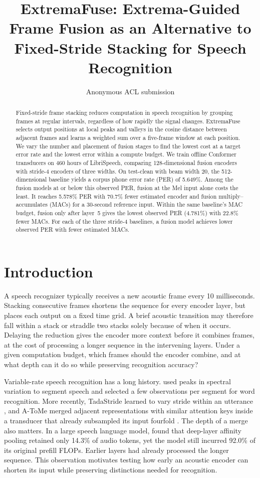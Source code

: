 \documentclass[11pt]{article}
\title{ExtremaFuse: Extrema-Guided Frame Fusion as an Alternative to
Fixed-Stride Stacking for Speech Recognition}
\author{Anonymous ACL submission}
\begin{document}
\maketitle

\begin{abstract}
Fixed-stride frame stacking reduces computation in speech recognition by grouping frames at regular intervals, regardless of how rapidly the signal changes.
ExtremaFuse selects output positions at local peaks and valleys in the cosine distance between adjacent frames and learns a weighted sum over a five-frame window at each position.
We vary the number and placement of fusion stages to find the lowest cost at a target error rate and the lowest error within a compute budget.
We train offline Conformer transducers on 460 hours of LibriSpeech, comparing 128-dimensional fusion encoders with stride-4 encoders of three widths.
On test-clean with beam width 20, the 512-dimensional baseline yields a corpus phone error rate (PER) of 5.649\%.
Among the fusion models at or below this observed PER, fusion at the Mel input alone costs the least. It reaches 5.578\% PER with 70.7\% fewer estimated encoder and fusion multiply--accumulates (MACs) for a 30-second reference input.
Within the same baseline's MAC budget, fusion only after layer~5 gives the lowest observed PER (4.781\%) with 22.8\% fewer MACs.
For each of the three stride-4 baselines, a fusion model achieves lower observed PER with fewer estimated MACs.
\end{abstract}

\section{Introduction}
A speech recognizer typically receives a new acoustic frame every 10 milliseconds. Stacking consecutive frames shortens the sequence for every encoder layer, but places each output on a fixed time grid. A brief acoustic transition may therefore fall within a stack or straddle two stacks solely because of when it occurs. Delaying the reduction gives the encoder more context before it combines frames, at the cost of processing a longer sequence in the intervening layers. Under a given computation budget, which frames should the encoder combine, and at what depth can it do so while preserving recognition accuracy?

Variable-rate speech recognition has a long history. \citet{flammia92_icslp} used peaks in spectral variation to segment speech and selected a few observations per segment for word recognition. More recently, TadaStride learned to vary stride within an utterance \citep{lee-jung-2025-tadastride}, and A-ToMe merged adjacent representations with similar attention keys inside a transducer that already subsampled its input fourfold \citep{li23i_interspeech}. The depth of a merge also matters. In a large speech language model, \citet{xiang-etal-2026-need} found that deep-layer affinity pooling retained only 14.3\% of audio tokens, yet the model still incurred 92.0\% of its original prefill FLOPs. Earlier layers had already processed the longer sequence. This observation motivates testing how early an acoustic encoder can shorten its input while preserving distinctions needed for recognition.
\end{document}
